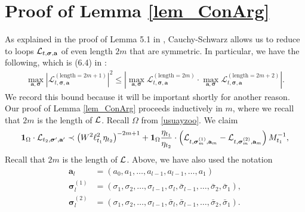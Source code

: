 \section{Proof of Lemma \ref{lem_ConArg}}\label{sec:Inh_LE}
As explained in the proof of Lemma 5.1 in \cite{YY_25}, Cauchy-Schwarz allows us to reduce to loops ${\cal L}_{t,\boldsymbol{\sigma},\textbf{a}}$ of even length $2m$ that are symmetric. In particular, we have the following, which is (6.4) in \cite{YY_25}:
\begin{align}\label{adummzps}
    \max_{\textbf{a}, \boldsymbol{\sigma}} \left|\mathcal{L}^{(\text{length} = 2m+1)}_{t, \boldsymbol{\sigma}, \textbf{a}}\right|^2 \le \left|\max_{\textbf{a}, \boldsymbol{\sigma}} \mathcal{L}^{(\text{length} = 2m)}_{t, \boldsymbol{\sigma}, \textbf{a}} \cdot \max_{\textbf{a}, \boldsymbol{\sigma}} \mathcal{L}^{(\text{length} = 2m+2)}_{t, \boldsymbol{\sigma}, \textbf{a}}\right|.  
  \end{align}
We record this bound because it will be important shortly for another reason. Our proof of Lemma \ref{lem_ConArg} proceeds inductively in $m$, where we recall that $2m$ is the length of ${\cal L}$. Recall $\Omega$ from \eqref{usuayzoo}. We claim 
    \begin{equation}\label{LWLIMZ}
      {\bf 1}_{\Omega}\cdot    \mathcal{L}_{t_2, \boldsymbol{\sigma}', \textbf{a}'} \prec \left( W^{2} \ell_{t_1}^{2} \eta_{t_2} \right)^{-2m+1} + {\bf 1}_{\Omega}\frac{\eta_{t_1}}{\eta_{t_2}}
        \cdot
        \left(
        \mathcal{L}_{t, \boldsymbol{\sigma}_m^{(1)}, \textbf{a}_m} - \mathcal{L}_{t, \boldsymbol{\sigma}_m^{(2)}, \textbf{a}_m} \right) M_{t_{1}}^{-1},
\end{equation}
Recall that $2m$ is the length of ${\cal L}$. Above, we have also used the notation
%
\begin{align*}
\textbf{a}_l &= (a_0, a_1, \ldots, a_{l-1}, a_{l-1}, \ldots, a_1) \\
\boldsymbol{\sigma}_l^{(1)}  &= (\sigma_1, \sigma_2, \ldots, \sigma_{l-1}, \sigma_l, \bar{\sigma}_{l-1}, \ldots, \bar{\sigma}_2, \bar{\sigma}_1),\\
\boldsymbol{\sigma}_l^{(2)}  &= (\sigma_1, \sigma_2, \ldots, \sigma_{l-1}, \bar{\sigma}_l, \bar{\sigma}_{l-1}, \ldots, \bar{\sigma}_2, \bar{\sigma}_1).
\end{align*}
%
